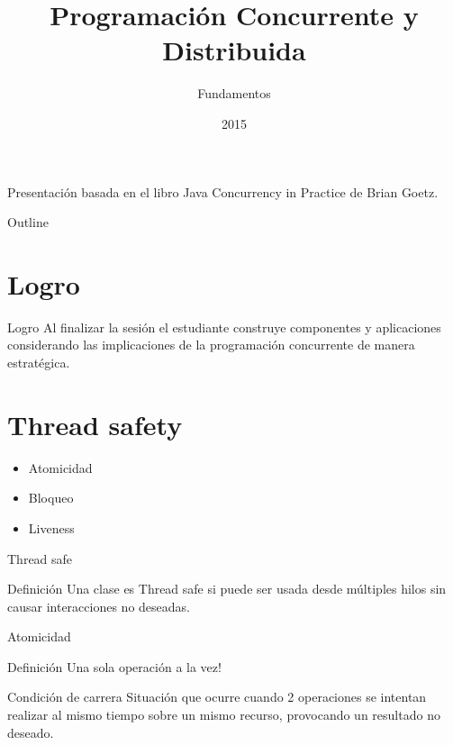 \documentclass[aspectratio=169]{beamer}
\title{Programación Concurrente y Distribuida}
\subtitle{Fundamentos}
\date{2015}
\institute{\href{http://www.upc.edu.pe}{Universidad Peruana de Ciencias Aplicadas}}
\begin{document}
\maketitle

\begin{frame}
Presentación basada en el libro Java Concurrency in Practice de Brian Goetz.
\end{frame}

\begin{frame}{Outline}
\begin{minipage}{\textwidth}
\tableofcontents
\end{minipage}
\end{frame}

\section{Logro} %
\begin{frame}{Logro}
Al finalizar la sesión el estudiante construye componentes y aplicaciones
considerando las implicaciones de la programación concurrente de manera
estratégica.
\end{frame}

\section{Thread safety} %
\begin{frame}
\begin{itemize}
\item Atomicidad
\item Bloqueo
\item Liveness
\end{itemize}
\end{frame}

\begin{frame}{Thread safe}
\begin{block}{Definición}
Una clase es Thread safe si puede ser usada desde múltiples hilos sin causar
interacciones no deseadas.
\end{block}
\end{frame}

\begin{frame}{Atomicidad}
\begin{block}{Definición}
Una sola operación a la vez!
\end{block}
\begin{block}{Condición de carrera}
Situación que ocurre cuando 2 operaciones se intentan realizar al mismo tiempo
sobre un mismo recurso, provocando un resultado no deseado.
\end{block}
\end{frame}
\end{document}
